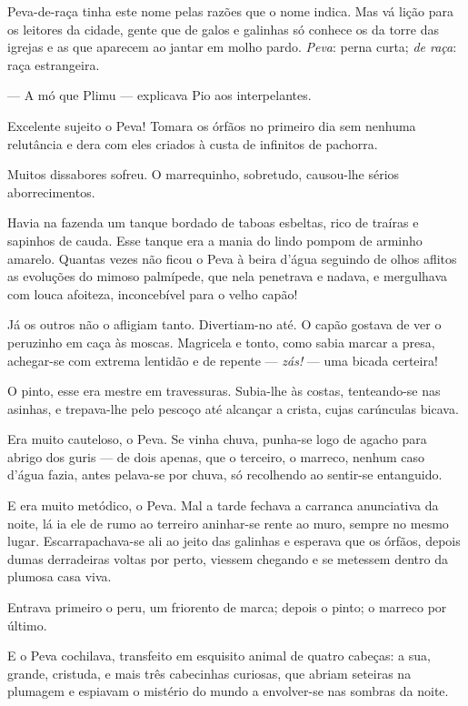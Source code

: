 Peva-de-raça tinha este nome pelas razões que o nome indica. Mas vá
lição para os leitores da cidade, gente que de galos e galinhas só
conhece os da torre das igrejas e as que aparecem ao jantar em molho
pardo. \emph{Peva}: perna curta; \emph{de raça}: raça estrangeira.

--- A mó que Plimu --- explicava Pio aos interpelantes.

Excelente sujeito o Peva! Tomara os órfãos no primeiro dia sem nenhuma
relutância e dera com eles criados à custa de infinitos de pachorra.

Muitos dissabores sofreu. O marrequinho, sobretudo, causou-lhe sérios
aborrecimentos.

Havia na fazenda um tanque bordado de taboas esbeltas, rico de traíras e
sapinhos de cauda. Esse tanque era a mania do lindo pompom de arminho
amarelo. Quantas vezes não ficou o Peva à beira d'água seguindo de olhos
aflitos as evoluções do mimoso palmípede, que nela penetrava e nadava, e
mergulhava com louca afoiteza, inconcebível para o velho capão!

Já os outros não o afligiam tanto. Divertiam-no até. O capão gostava de
ver o peruzinho em caça às moscas. Magricela e tonto, como sabia marcar
a presa, achegar-se com extrema lentidão e de repente --- \emph{zás!}
--- uma bicada certeira!

O pinto, esse era mestre em travessuras. Subia-lhe às costas,
tenteando-se nas asinhas, e trepava-lhe pelo pescoço até alcançar a
crista, cujas carúnculas bicava.

Era muito cauteloso, o Peva. Se vinha chuva, punha-se logo de agacho
para abrigo dos guris --- de dois apenas, que o terceiro, o marreco,
nenhum caso d'água fazia, antes pelava-se por chuva, só recolhendo ao
sentir-se entanguido.

E era muito metódico, o Peva. Mal a tarde fechava a carranca anunciativa
da noite, lá ia ele de rumo ao terreiro aninhar-se rente ao muro, sempre
no mesmo lugar. Escarrapachava-se ali ao jeito das galinhas e esperava
que os órfãos, depois dumas derradeiras voltas por perto, viessem
chegando e se metessem dentro da plumosa casa viva.

Entrava primeiro o peru, um friorento de marca; depois o pinto; o
marreco por último.

E o Peva cochilava, transfeito em esquisito animal de quatro cabeças: a
sua, grande, cristuda, e mais três cabecinhas curiosas, que abriam
seteiras na plumagem e espiavam o mistério do mundo a envolver-se nas
sombras da noite.


